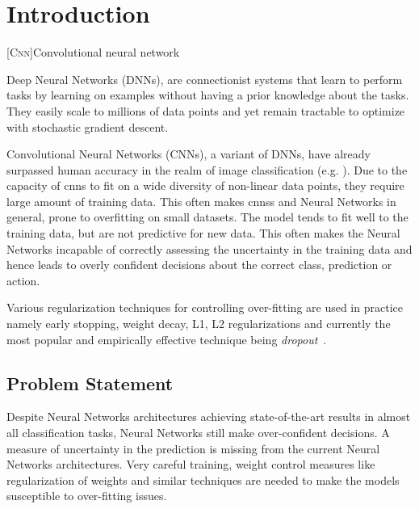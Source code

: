 \chapter{Introduction}  %

\ifpdf
    \graphicspath{{Chapter1/Figs/Raster/}{Chapter1/Figs/PDF/}{Chapter1/Figs/}}
\else
    \graphicspath{{Chapter1/Figs/Vector/}{Chapter1/Figs/}}
\fi



[\textsc{Cnn}]{Convolutional neural network}

Deep Neural Networks (DNNs), are connectionist systems that learn to perform tasks by learning on examples without having a prior knowledge about the tasks. 
They easily scale to millions of data points and yet remain tractable to optimize with stochastic gradient descent.

Convolutional Neural Networks (CNNs), a variant of DNNs, have already surpassed human accuracy in the realm of image classification (e.g. \cite{he2016deep,simonyan2014very,krizhevsky2012imagenet}). Due to the capacity of \acp{cnn} to fit on a wide diversity of non-linear data points, they require large amount of training data. This often makes \acp{cnn}s and Neural Networks in general, prone to overfitting on small datasets. The model tends to fit well to the training data, but are not predictive for new data. This often makes the Neural Networks incapable of correctly assessing the uncertainty in the training data and hence leads to overly confident decisions about the correct class, prediction or action.

Various regularization techniques for controlling over-fitting are used in practice namely  early stopping, weight decay, L1, L2 regularizations and currently the most popular and empirically effective technique being \emph{dropout}~\cite{hinton2012improving}. 


\section{Problem Statement}

Despite Neural Networks architectures achieving state-of-the-art results in almost all classification tasks, Neural Networks still make over-confident decisions. A measure of uncertainty in the prediction is missing from the current Neural Networks architectures. Very careful training, weight control measures like regularization of weights and similar techniques are needed to make the models susceptible to over-fitting issues. 

